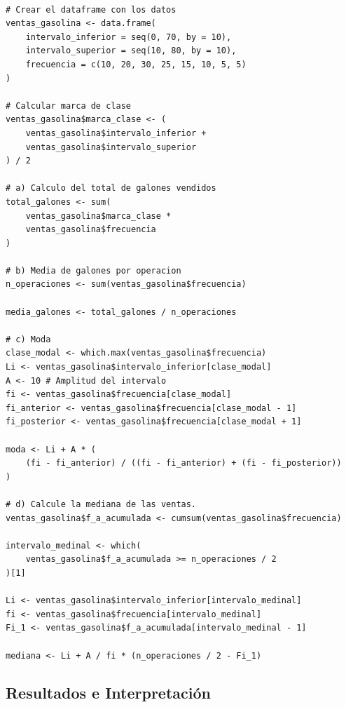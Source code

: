 \documentclass[12pt, a4paper]{article}
\begin{document}
\begin{lstlisting}[caption=Análisis de Ventas de Gasolina]

# Crear el dataframe con los datos
ventas_gasolina <- data.frame(
    intervalo_inferior = seq(0, 70, by = 10),
    intervalo_superior = seq(10, 80, by = 10),
    frecuencia = c(10, 20, 30, 25, 15, 10, 5, 5)
)

# Calcular marca de clase
ventas_gasolina$marca_clase <- (
    ventas_gasolina$intervalo_inferior +
    ventas_gasolina$intervalo_superior
) / 2

# a) Calculo del total de galones vendidos
total_galones <- sum(
    ventas_gasolina$marca_clase *
    ventas_gasolina$frecuencia
)

# b) Media de galones por operacion
n_operaciones <- sum(ventas_gasolina$frecuencia)

media_galones <- total_galones / n_operaciones

# c) Moda
clase_modal <- which.max(ventas_gasolina$frecuencia)
Li <- ventas_gasolina$intervalo_inferior[clase_modal]
A <- 10 # Amplitud del intervalo
fi <- ventas_gasolina$frecuencia[clase_modal]
fi_anterior <- ventas_gasolina$frecuencia[clase_modal - 1]
fi_posterior <- ventas_gasolina$frecuencia[clase_modal + 1]

moda <- Li + A * (
    (fi - fi_anterior) / ((fi - fi_anterior) + (fi - fi_posterior))
)

# d) Calcule la mediana de las ventas.
ventas_gasolina$f_a_acumulada <- cumsum(ventas_gasolina$frecuencia)

intervalo_medinal <- which(
    ventas_gasolina$f_a_acumulada >= n_operaciones / 2
)[1]

Li <- ventas_gasolina$intervalo_inferior[intervalo_medinal]
fi <- ventas_gasolina$frecuencia[intervalo_medinal]
Fi_1 <- ventas_gasolina$f_a_acumulada[intervalo_medinal - 1]

mediana <- Li + A / fi * (n_operaciones / 2 - Fi_1)    

\end{lstlisting}

\subsection{Resultados e Interpretación}
\end{document}
